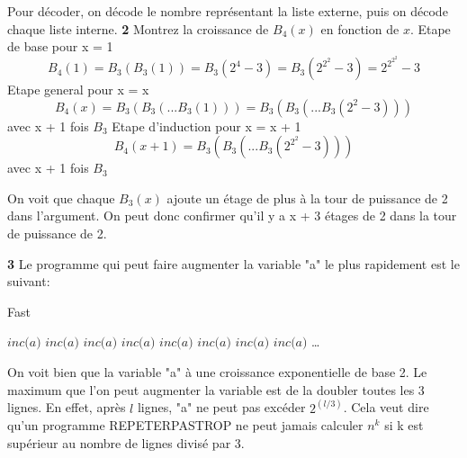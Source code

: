 \documentclass{article}
\begin{document}
    Pour décoder, on décode le nombre représentant la liste externe, puis on décode chaque liste interne.
    \newline \newline
    \textbf{2}
    Montrez la croissance de $B_4(x)$ en fonction de $x$.
    \newline    
    Etape de base pour x = 1
    \begin{equation}
        B_4(1) = B_3(B_3(1)) = B_3(2^4-3) = B_3(2^{2^2}-3) = 2^{2^{2^2}} - 3
    \end{equation}
    Etape general pour x = x
    \begin{equation} 
        B_4(x) = B_3(B_3 ( ... B_3(1))) = B_3(B_3 ( ... B_3(2^2 - 3)))
    \end{equation} 
    avec x + 1 fois $B_3$ \newline
    Etape d'induction pour x = x + 1
    \begin{equation}
        B_4(x+1) = B_3(B_3 ( ... B_3 (2^{2^2} - 3)))
    \end{equation}
    avec x + 1 fois $B_3$

    On voit que chaque $B_3(x)$ ajoute un étage de plus à la tour de puissance de 2 dans l'argument. 
    On peut donc confirmer qu'il y a x + 3 étages de 2 dans la tour de puissance de 2.

    \textbf{3}
    Le programme qui peut faire augmenter la variable "a" le plus rapidement est le suivant:
    \begin{algorithm}[H]
        \caption{Fast}\label{Fast}
        \begin{algorithmic}
        \State $\textit{inc(a)}$
        \State $\textit{inc(a)}$
        \State $\textit{inc(a)}$
        \State $\textit{inc(a)}$ 
            \State $\textit{inc(a)}$
        \EndFor{}
            \State $\textit{inc(a)}$
        \EndFor{}
            \State $\textit{inc(a)}$
        \EndFor{}
            \State $\textit{inc(a)}$
        \EndFor
        \dots
        \EndProcedure
        \end{algorithmic}
    \end{algorithm}

    On voit bien que la variable "a" à une croissance exponentielle de base 2.
    Le maximum que l'on peut augmenter la variable est de la doubler toutes les 3 lignes.
    En effet, après $l$ lignes, "a" ne peut pas excéder $2^{(l / 3)}$.
    Cela veut dire qu'un programme REPETERPASTROP ne peut jamais calculer $n^k$ si k est supérieur au
    nombre de lignes divisé par 3.
\end{document}
